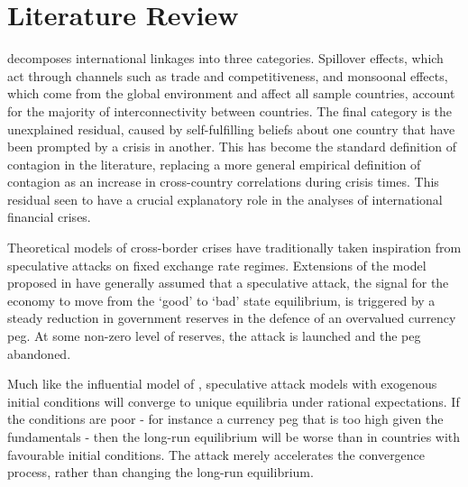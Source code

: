 \documentclass[../base.tex]{subfiles}
\begin{document}
\section{Literature Review}
\label{lit}

\cite{masson1998contagion} decomposes international linkages into three categories. Spillover effects, which act through channels such as trade and competitiveness, and monsoonal effects, which come from the global environment and affect all sample countries, account for the majority of interconnectivity between countries. The final category is the unexplained residual, caused by self-fulfilling beliefs about one country that have been prompted by a crisis in another. This has become the standard definition of contagion in the literature, replacing a more general empirical definition of contagion as an increase in cross-country correlations during crisis times. This residual seen to have a crucial explanatory role in the analyses of international financial crises. 

Theoretical models of cross-border crises have traditionally taken inspiration from speculative attacks on fixed exchange rate regimes. Extensions of the model proposed in \cite{krugman1979model} have generally assumed that a speculative attack, the signal for the economy to move from the `good' to `bad' state equilibrium, is triggered by a steady reduction in government reserves in the defence of an overvalued currency peg. At some non-zero level of reserves, the attack is launched and the peg abandoned.

Much like the influential model of \cite{barro1983rules}, speculative attack models with exogenous initial conditions will converge to unique equilibria under rational expectations. If the conditions are poor - for instance a currency peg that is too high given the fundamentals - then the long-run equilibrium will be worse than in countries with favourable initial conditions. The attack merely accelerates the convergence process, rather than changing the long-run equilibrium.
\end{document}
